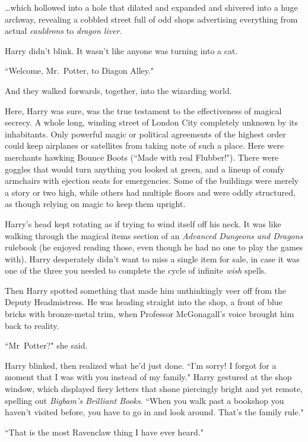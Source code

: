 {\ldots}which hollowed into a hole that dilated and expanded and shivered into a huge archway, revealing a cobbled street full of odd shops advertising everything from actual \emph{cauldrons} to \emph{dragon liver.}

Harry didn't blink. It wasn't like anyone was turning into a cat.

``Welcome, Mr.~Potter, to Diagon Alley."

And they walked forwards, together, into the wizarding world.

Here, Harry was sure, was the true testament to the effectiveness of magical secrecy. A whole long, winding street of London City completely unknown by its inhabitants. Only powerful magic or political agreements of the highest order could keep airplanes or satellites from taking note of such a place. Here were merchants hawking Bounce Boots (``Made with real Flubber!"). There were goggles that would turn anything you looked at green, and a lineup of comfy armchairs with ejection seats for emergencies. Some of the buildings were merely a story or two high, while others had multiple floors and were oddly structured, as though relying on magic to keep them upright.

Harry's head kept rotating as if trying to wind itself off his neck. It was like walking through the magical items section of an \emph{Advanced Dungeons and Dragons} rulebook (he enjoyed reading those, even though he had no one to play the games with). Harry desperately didn't want to miss a single item for sale, in case it was one of the three you needed to complete the cycle of infinite \emph{wish} spells.

Then Harry spotted something that made him unthinkingly veer off from the Deputy Headmistress. He was heading straight into the shop, a front of blue bricks with bronze-metal trim, when Professor McGonagall's voice brought him back to reality.

``Mr~Potter?" she said.

Harry blinked, then realized what he'd just done. ``I'm sorry! I forgot for a moment that I was with you instead of my family." Harry gestured at the shop window, which displayed fiery letters that shone piercingly bright and yet remote, spelling out \emph{Bigbam's Brilliant Books}. ``When you walk past a bookshop you haven't visited before, you have to go in and look around. That's the family rule."

``That is the most Ravenclaw thing I have ever heard."

